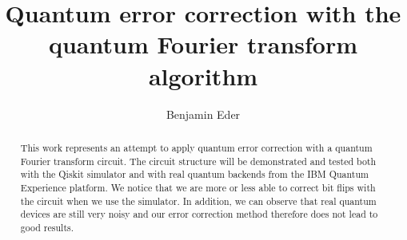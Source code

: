 \documentclass[num-refs]{wiley-networks}
\title{Quantum error correction with the quantum Fourier transform algorithm}
\author[1\authfn{1}]{Benjamin Eder}
\begin{document}
    \maketitle

    \begin{abstract}
        This work represents an attempt to apply quantum error correction with a quantum Fourier transform circuit.
        The circuit structure will be demonstrated and tested both with the Qiskit simulator and with real quantum backends from the IBM Quantum Experience platform.
        We notice that we are more or less able to correct bit flips with the circuit when we use the simulator.
        In addition, we can observe that real quantum devices are still very noisy and our error correction method therefore does not lead to good results.
    \end{abstract}


    \begingroup
    \hypersetup{linkcolor=black}
    \tableofcontents
    \endgroup

    \setlength{\parskip}{0.2cm}%

    
    
    
    
    
    

    \newpage

    

    \newpage

    \appendix
    
    
\end{document}
